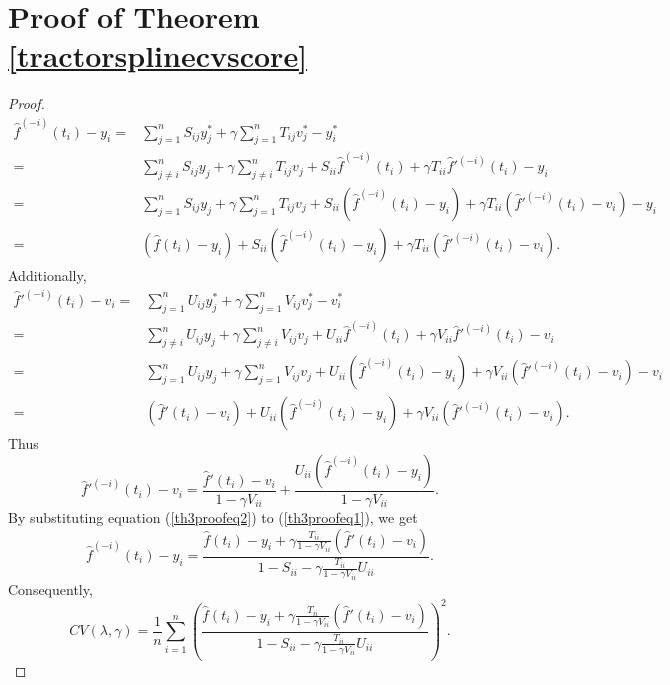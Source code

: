 \section{Proof of Theorem \ref{tractorsplinecvscore}}

\begin{proof}
\begin{equation}\label{th3proofeq1}
\begin{split}
\hat{f}^{(-i)}(t_i)-y_i=& \sum_{j=1}^{n}S_{ij}y_j^*+ \gamma \sum_{j=1}^{n}T_{ij}v_j^*-y_i^*\\
=&\sum_{j\neq i}^{n}S_{ij}y_j+ \gamma \sum_{j\neq i}^{n}T_{ij}v_j+S_{ii}\hat{f}^{(-i)}(t_i)+\gamma T_{ii}\hat{f}'^{(-i)}(t_i)-y_i\\
=&\sum_{j=1}^{n}S_{ij}y_j+ \gamma \sum_{j=1}^{n}T_{ij}v_j+S_{ii}\left(\hat{f}^{(-i)}(t_i)-y_i\right)+\gamma T_{ii}\left(\hat{f}'^{(-i)}(t_i)-v_i\right)-y_i\\
=&\left(\hat{f}(t_i)-y_i\right)+S_{ii}\left(\hat{f}^{(-i)}(t_i)-y_i\right)+\gamma T_{ii}\left(\hat{f}'^{(-i)}(t_i)-v_i\right).
\end{split}
\end{equation}
Additionally, 
\begin{equation}
\begin{split}
\hat{f}'^{(-i)}(t_i)-v_i=& \sum_{j=1}^{n}U_{ij}y_j^*+ \gamma \sum_{j=1}^{n}V_{ij}v_j^*-v_i^*\\
=&\sum_{j\neq i}^{n}U_{ij}y_j+ \gamma \sum_{j\neq i}^{n}V_{ij}v_j+U_{ii}\hat{f}^{(-i)}(t_i)+\gamma V_{ii}\hat{f}'^{(-i)}(t_i)-v_i\\
=&\sum_{j=1}^{n}U_{ij}y_j+ \gamma \sum_{j=1}^{n}V_{ij}v_j+U_{ii}\left(\hat{f}^{(-i)}(t_i)-y_i\right)+\gamma V_{ii}\left(\hat{f}'^{(-i)}(t_i)-v_i\right)-v_i\\
=&\left(\hat{f}'(t_i)-v_i\right)+U_{ii}\left(\hat{f}^{(-i)}(t_i)-y_i\right)+\gamma V_{ii}\left(\hat{f}'^{(-i)}(t_i)-v_i\right).
\end{split}
\end{equation}
Thus 
\begin{equation}\label{th3proofeq2}
\hat{f}'^{(-i)}(t_i)-v_i = \frac{\hat{f}'(t_i)-v_i}{1-\gamma V_{ii}}+ \frac{U_{ii}\left(\hat{f}^{(-i)}(t_i)-y_i\right)}{1-\gamma V_{ii}}.
\end{equation}
By substituting equation (\ref{th3proofeq2}) to (\ref{th3proofeq1}), we get
\begin{equation*}
\hat{f}^{(-i)}(t_i)-y_i=\frac{\hat{f}(t_i)-y_i+\gamma \frac{T_{ii}}{1-\gamma V_{ii}}\left(\hat{f}'(t_i)-v_i\right)}{1-S_{ii}-\gamma\frac{T_{ii}}{1-\gamma V_{ii}}U_{ii}}.
\end{equation*}
Consequently, 
\begin{equation*}
CV(\lambda,\gamma)=\frac{1}{n}\sum_{i=1}^{n}\left( \frac{\hat{f}(t_i)-y_i+\gamma \frac{T_{ii}}{1-\gamma V_{ii}}\left(\hat{f}'(t_i)-v_i\right)}{1-S_{ii}-\gamma\frac{T_{ii}}{1-\gamma V_{ii}}U_{ii}}\right)^2.
\end{equation*}
\end{proof}


